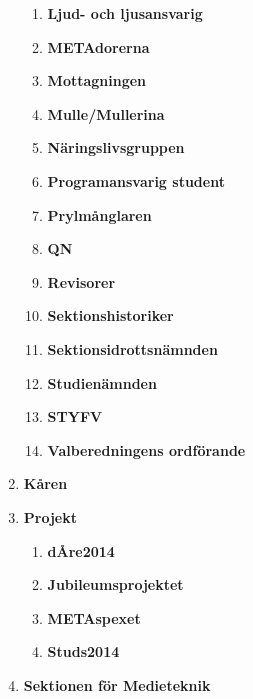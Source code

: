 \documentclass[a4paper]{article}
\begin{document}
\begin{enumerate}
\begin{enumerate}
    \item \textbf{Ljud- och ljusansvarig}

    \item \textbf{METAdorerna}

    \item \textbf{Mottagningen}

    \item \textbf{Mulle/Mullerina}

    \item \textbf{Näringslivsgruppen}

    \item \textbf{Programansvarig student}

    \item \textbf{Prylmånglaren}

    \item \textbf{QN} 

    \item \textbf{Revisorer}

    \item \textbf{Sektionshistoriker}

    \item \textbf{Sektionsidrottsnämnden}

    \item \textbf{Studienämnden}

    \item \textbf{STYFV}

    \item \textbf{Valberedningens ordförande} 

  \end{enumerate}

\item \textbf{Kåren}

\item \textbf{Projekt}

  \begin{enumerate}

    \item \textbf{dÅre2014}

    \item \textbf{Jubileumsprojektet}

    \item \textbf{METAspexet}

    \item \textbf{Studs2014}

  \end{enumerate}

\item \textbf{Sektionen för Medieteknik}

\end{enumerate}
\end{document}
